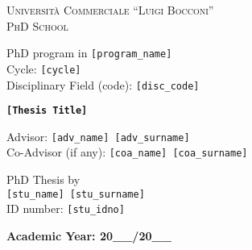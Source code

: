 \begin{titlepage}
  \Large
  \begin{center}
    {\LARGE \textsc{Università Commerciale ``Luigi Bocconi''} } \\
    {\LARGE \textsc{PhD School} }

    \vspace{1.5cm}

    \begin{raggedright}
      PhD program in \texttt{[program\_name]} \\
      Cycle: \texttt{[cycle]} \\
      Disciplinary Field (code): \texttt{[disc\_code]} \\
    \end{raggedright}

    \vfill

    {\Huge \bfseries \texttt{[Thesis Title]}}

    \vfill

    \begin{raggedright}
      Advisor: \texttt{[adv\_name] [adv\_surname]} \\
      Co-Advisor (if any): \texttt{[coa\_name] [coa\_surname]} \\
    \end{raggedright}

    \vspace{1.5cm}

    \begin{raggedleft}
      PhD Thesis by \\
      \texttt{[stu\_name] [stu\_surname]} \\
      ID number: \texttt{[stu\_idno]} \\
    \end{raggedleft}

    \vfill

    \textbf{Academic Year: 20\_\_/20\_\_}
  \end{center}
\end{titlepage}
